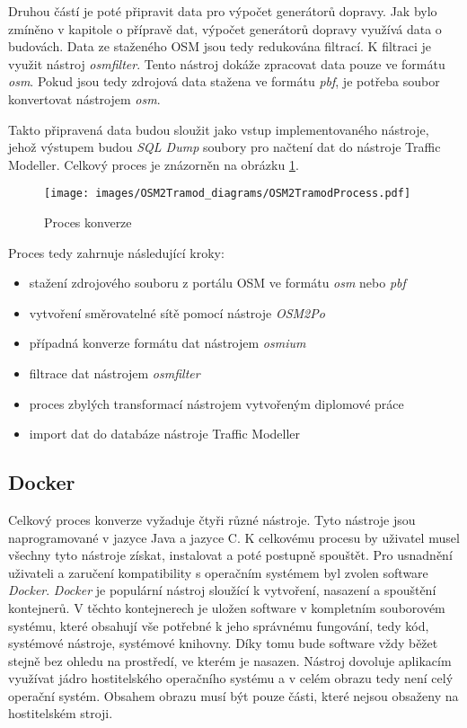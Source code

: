 Druhou částí je poté připravit data pro výpočet generátorů dopravy. Jak bylo zmíněno v kapitole o přípravě dat, výpočet generátorů dopravy využívá data o budovách. Data ze staženého OSM jsou tedy redukována filtrací. K filtraci je využit nástroj \textit{osmfilter}. Tento nástroj dokáže zpracovat data pouze ve formátu \textit{osm}. Pokud jsou tedy zdrojová data stažena ve formátu \textit{pbf}, je potřeba soubor konvertovat nástrojem \textit{osm}.

Takto připravená data budou sloužit jako vstup implementovaného nástroje, jehož výstupem budou \textit{SQL Dump} soubory pro načtení dat do nástroje Traffic Modeller. Celkový proces je znázorněn na obrázku \ref{obr:proces_konverze}.

\begin{figure}[htbp]
\centering
\texttt{[image: images/OSM2Tramod\_diagrams/OSM2TramodProcess.pdf]}
\caption{Proces konverze}
\label{obr:proces_konverze}
\end{figure}

Proces tedy zahrnuje následující kroky: 

\begin{itemize}
  \item stažení zdrojového souboru z portálu OSM ve formátu \textit{osm} nebo \textit{pbf}
  \item vytvoření směrovatelné sítě pomocí nástroje \textit{OSM2Po}
  \item případná konverze formátu dat nástrojem \textit{osmium}
  \item filtrace dat nástrojem \textit{osmfilter}
  \item proces zbylých transformací nástrojem vytvořeným diplomové práce
  \item import dat do databáze nástroje Traffic Modeller
\end{itemize}

\subsection{Docker}

Celkový proces konverze vyžaduje čtyři různé nástroje. Tyto nástroje jsou naprogramované v jazyce Java a jazyce C. K celkovému procesu by uživatel musel všechny tyto nástroje získat, instalovat a poté postupně spouštět. Pro usnadnění uživateli a zaručení kompatibility s operačním systémem byl zvolen software \textit{Docker}. \textit{Docker} je populární nástroj sloužící k vytvoření, nasazení a spouštění kontejnerů. V těchto kontejnerech je uložen software v kompletním souborovém systému, které obsahují vše potřebné k jeho správnému fungování, tedy kód, systémové nástroje, systémové knihovny. Díky tomu bude software vždy běžet stejně bez ohledu na prostředí, ve kterém je nasazen. Nástroj dovoluje aplikacím využívat jádro hostitelského operačního systému a v celém obrazu tedy není celý operační systém. Obsahem obrazu musí být pouze části, které nejsou obsaženy na hostitelském stroji. 

